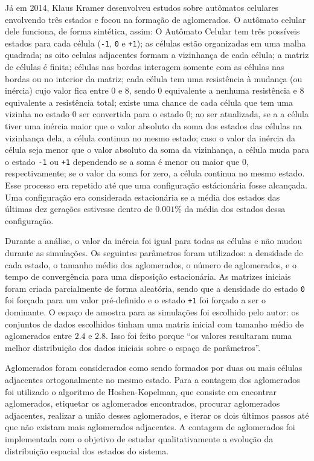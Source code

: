 \documentclass[
	12pt,				%
	openright,			%
	twoside,			%
	a4paper,			%
	english,			%
	french,				%
	spanish,			%
	brazil				%
	]{abntex2}
\begin{document}
Já em 2014, Klaus Kramer \cite{klaus} desenvolveu estudos sobre autômatos celulares envolvendo três estados e focou na formação de aglomerados. O autômato celular dele funciona, de forma sintética, assim: O Autômato Celular tem três possíveis estados para cada célula (\texttt{-1}, \texttt{0} e \texttt{+1}); as células estão organizadas em uma malha quadrada; as oito celulas adjacentes formam a vizinhança de cada célula; a matriz de células é finita; células nas bordas interagem somente com as células nas bordas ou no interior da matriz; cada célula tem uma resistência à mudança (ou inércia) cujo valor fica entre $0$ e $8$, sendo $0$ equivalente a nenhuma resistência e $8$ equivalente a resistência total; existe uma chance de cada célula que tem uma vizinha no estado $0$ ser convertida para o estado $0$; ao ser atualizada, se a a célula tiver uma inércia maior que o valor absoluto da soma dos estados das células na vizinhança dela, a célula continua no mesmo estado; caso o valor da inércia da célula seja menor que o valor absoluto da soma da vizinhança, a célula muda para o estado \texttt{-1} ou \texttt{+1} dependendo se a soma é menor ou maior que $0$, respectivamente; se o valor da soma for zero, a célula continua no mesmo estado. Esse processo era repetido até que uma configuração estácionária fosse alcançada. Uma configuração era considerada estacionária se a média dos estados das últimas dez gerações estivesse dentro de $0.001\%$ da média dos estados dessa configuração.

Durante a análise, o valor da inércia foi igual para todas as células e não mudou durante as simulações. Os seguintes parâmetros foram utilizados: a densidade de cada estado, o tamanho médio dos aglomerados, o número de aglomerados, e o tempo de convergência para uma disposição estacionária. As matrizes iniciais foram criada parcialmente de forma aleatória, sendo que a densidade do estado \texttt{0} foi forçada para um valor pré-definido e o estado \texttt{+1} foi forçado a ser o dominante. O espaço de amostra para as simulações foi escolhido pelo autor: os conjuntos de dados escolhidos tinham uma matriz inicial com tamanho médio de aglomerados entre $2.4$ e $2.8$. Isso foi feito porque ``os valores resultaram numa melhor distribuição dos dados iniciais sobre o espaço de parâmetros''.

Aglomerados foram considerados como sendo formados por duas ou mais células adjacentes ortogonalmente no mesmo estado. 
Para a contagem dos aglomerados foi utilizado o algoritmo de Hoshen-Kopelman, que consiste em encontrar aglomerados, etiquetar os aglomerados encontrados, procurar aglomerados adjacentes, realizar a união desses aglomerados, e iterar os dois últimos passos até que não existam mais aglomerados adjacentes. A contagem de aglomerados foi implementada com o objetivo de estudar qualitativamente a evolução da distribuição espacial dos estados do sistema.
\end{document}
